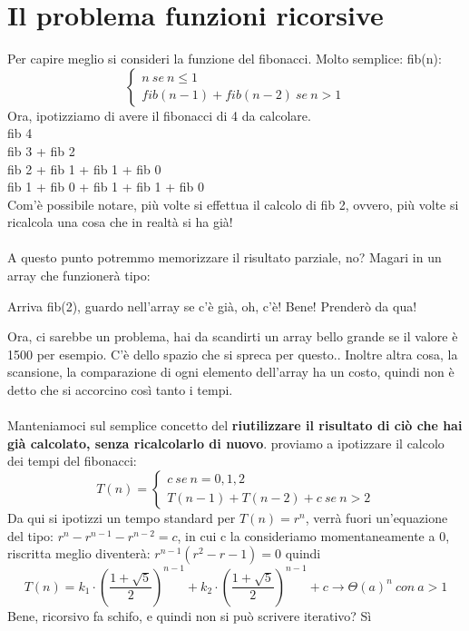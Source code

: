 \documentclass[12pt, a4paper, openany, twoside]{book}
\begin{document}
\section{Il problema funzioni ricorsive}
Per capire meglio si consideri la funzione del fibonacci. Molto semplice:
fib(n):
\[
	\begin{cases}
		n ~ se ~ n \leq 1 \\
		fib(n-1) + fib(n-2) ~ se ~ n > 1
	\end{cases}
\]
Ora, ipotizziamo di avere il fibonacci di 4 da calcolare. \\
fib 4 \\
fib 3 + fib 2 \\
fib 2 + fib 1 + fib 1 + fib 0 \\
fib 1 + fib 0 + fib 1 + fib 1 + fib 0\\
Com'è possibile notare, più volte si effettua il calcolo di fib 2, ovvero, più
volte si ricalcola una cosa che in realtà si ha già! \\ \\
A questo punto potremmo memorizzare il risultato parziale, no? Magari in un 
array che funzionerà tipo:
\begin{center}
	Arriva fib(2), guardo nell'array se c'è già, oh, c'è! Bene! Prenderò da qua!\\
\end{center}
Ora, ci sarebbe un problema, hai da scandirti un array bello grande se il valore è
1500 per esempio. C'è dello spazio che si spreca per questo.. Inoltre altra cosa,
la scansione, la comparazione di ogni elemento dell'array ha un costo, quindi 
non è detto che si accorcino così tanto i tempi. \\ \\
Manteniamoci sul semplice concetto del \textbf{riutilizzare il risultato di ciò
che hai già calcolato, senza ricalcolarlo di nuovo}.
proviamo a ipotizzare il calcolo dei tempi del fibonacci:
\[
	T(n)=
	\begin{cases}
		c ~ se ~ n = 0,1,2\\
		T(n-1)+T(n-2)+c ~ se ~ n > 2
	\end{cases}
\]	
Da qui si ipotizzi un tempo standard per $T(n) = r^{n}$, verrà fuori un'equazione
del tipo: $r^{n}-r^{n-1}-r^{n-2} = c$, in cui c la consideriamo momentaneamente a
0, riscritta meglio diventerà: $r^{n-1}(r^{2}-r-1)=0$ quindi 
\[
	T(n) = k_{1} \cdot (\frac{1+\sqrt{5}}{2})^{n-1} + k_{2} \cdot 
	(\frac{1+\sqrt{5}}{2})^{n-1} + c \to \Theta(a)^{n} ~ con ~ a > 1
\]
Bene, ricorsivo fa schifo, e quindi non si può scrivere iterativo? Sì
\end{document}

